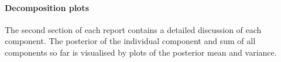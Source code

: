 \documentclass{article}
\begin{document}
%
%
%
%


\paragraph{Decomposition plots}

The second section of each report contains a detailed discussion of each component.
The posterior of the individual component and sum of all components so far is visualised by plots of the posterior mean and variance.
\end{document}
